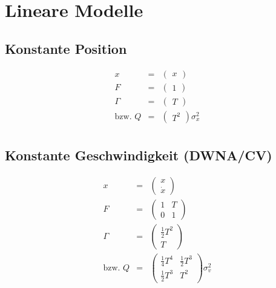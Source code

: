 \section{Lineare Modelle}
\subsection{Konstante Position}
\begin{eqnarray*}
    x &=& \begin{pmatrix} x\end{pmatrix} \\
    F &=& \begin{pmatrix} 1\end{pmatrix} \\
    \Gamma &=& \begin{pmatrix} T \end{pmatrix} \\
    \text{bzw. } Q &=& 
        \begin{pmatrix} 
            T^2 
        \end{pmatrix}
        \sigma^2_x \\
\end{eqnarray*}

\subsection{Konstante Geschwindigkeit (DWNA/CV)}
\begin{eqnarray*}
    x &=& \begin{pmatrix} x \\ \dot{x} \end{pmatrix} \\
    F &=& \begin{pmatrix} 1 & T \\ 0 & 1 \end{pmatrix} \\
    \Gamma &=& \begin{pmatrix} \frac{1}{2} T^2 \\ T \end{pmatrix} \\
    \text{bzw. } Q &=& 
        \begin{pmatrix} 
            \frac{1}{4} T^4 & \frac{1}{2} T^3 \\ 
            \frac{1}{2} T^3 & T^2 
        \end{pmatrix}
        \sigma^2_v \\
\end{eqnarray*}

